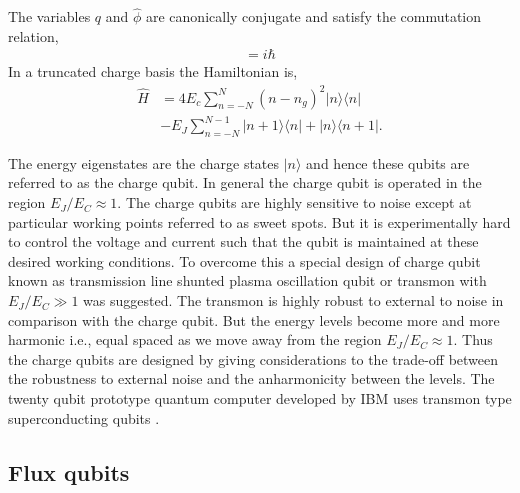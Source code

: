 \documentclass[twocolumn, aps, rmp, amsmath, amssymb, nofootinbib, superscriptaddress, longbibliography, floatfix, table-of-contents, eqsecnum]{revtex4-1}
\newcommand{\bra}[1]{\langle#1|}
\newcommand{\ket}[1]{|#1\rangle}
\begin{document}
The variables $q$ and $\hat{\phi}$ are canonically conjugate and satisfy the commutation relation,
\begin{align}
[ \hat{\phi},\hat{q} ] = i \hbar
\end{align}
In a truncated charge basis the Hamiltonian is,
\begin{align}
\hat{H} &= 4 E_{c} \sum_{n = -N}^{N} (n - n_{g})^{2} \ket{n}\bra{n}\nonumber\\
&- E_{J} \sum_{n = -N}^{N-1} \ket{n+1}\bra{n} + \ket{n}\bra{n+1}.
\end{align}

The energy eigenstates are the charge states $\ket{n}$ and hence these qubits are referred to as the charge qubit. In general the charge qubit \cite{bib:bouchiat1998quantum, bib:nakamura1999coherent} is operated in the region $E_{J}/E_{C} \approx 1$. The charge qubits are highly sensitive to noise except at particular working points referred to as sweet spots. But it is experimentally hard to control the voltage and current such that the qubit is maintained at these desired working conditions. To overcome this a special design of charge qubit known as transmission line shunted plasma oscillation qubit or transmon \cite{bib:koch2007charge} with $E_{J}/E_{C} \gg 1$ was suggested. The transmon is highly robust to external to noise in comparison with the charge qubit. But the energy levels become more and more harmonic i.e., equal spaced as we move away from the region $E_{J}/E_{C} \approx 1$. Thus the charge qubits are designed by giving considerations to the trade-off between the robustness to external noise and the anharmonicity between the levels. The twenty qubit prototype quantum computer developed by IBM uses transmon type superconducting qubits \cite{bib:gambetta2017building}. 

\subsection{Flux qubits}
\end{document}

